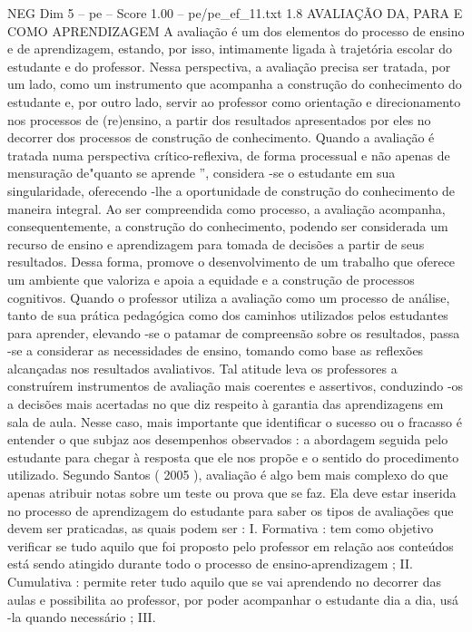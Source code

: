 \begin{textsample}{NEG Dim 5 – pe – Score 1.00 – pe/pe\_ef\_11.txt}  \label{ex:f5_neg_090}
1.8 AVALIAÇÃO DA, PARA E COMO APRENDIZAGEM A avaliação é um dos elementos do processo de ensino e de aprendizagem, estando, por isso, intimamente ligada à trajetória escolar do estudante e do professor.
Nessa perspectiva, a avaliação precisa ser tratada, por um lado, como um instrumento que acompanha a construção do conhecimento do estudante e, por outro lado, servir ao professor como orientação e direcionamento nos processos de (re)ensino, a partir dos resultados apresentados por eles no decorrer dos processos de construção de conhecimento.
Quando a avaliação é tratada numa perspectiva crítico-reflexiva, de forma processual e não apenas de mensuração de"quanto se aprende ”, considera -se o estudante em sua singularidade, oferecendo -lhe a oportunidade de construção do conhecimento de maneira integral.
Ao ser compreendida como processo, a avaliação acompanha, consequentemente, a construção do conhecimento, podendo ser considerada um recurso de ensino e aprendizagem para tomada de decisões a partir de seus resultados.
Dessa forma, promove o desenvolvimento de um trabalho que oferece um ambiente que valoriza e apoia a equidade e a construção de processos cognitivos.
Quando o professor utiliza a avaliação como um processo de análise, tanto de sua prática pedagógica como dos caminhos utilizados pelos estudantes para aprender, elevando -se o patamar de compreensão sobre os resultados, passa -se a considerar as necessidades de ensino, tomando como base as reflexões alcançadas nos resultados avaliativos.
Tal atitude leva os professores a construírem instrumentos de avaliação mais coerentes e assertivos, conduzindo -os a decisões mais acertadas no que diz respeito à garantia das aprendizagens em sala de aula.
Nesse caso, mais importante que identificar o sucesso ou o fracasso é entender o que subjaz aos desempenhos observados : a abordagem seguida pelo estudante para chegar à resposta que ele nos propõe e o sentido do procedimento utilizado.
Segundo Santos ( 2005 ), avaliação é algo bem mais complexo do que apenas atribuir notas sobre um teste ou prova que se faz.
Ela deve estar inserida no processo de aprendizagem do estudante para saber os tipos de avaliações que devem ser praticadas, as quais podem ser : I.
Formativa : tem como objetivo verificar se tudo aquilo que foi proposto pelo professor em relação aos conteúdos está sendo atingido durante todo o processo de ensino-aprendizagem ; II.
Cumulativa : permite reter tudo aquilo que se vai aprendendo no decorrer das aulas e possibilita ao professor, por poder acompanhar o estudante dia a dia, usá -la quando necessário ; III.

\end{textsample}
